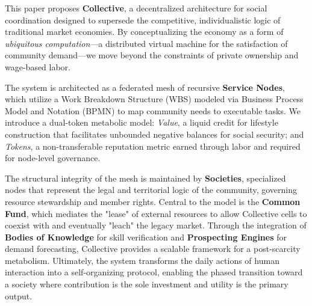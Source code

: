 
\noindent This paper proposes \textbf{Collective}, a decentralized architecture for social coordination designed to supersede the competitive, individualistic logic of traditional market economies. By conceptualizing the economy as a form of \textit{ubiquitous computation}—a distributed virtual machine for the satisfaction of community demand—we move beyond the constraints of private ownership and wage-based labor. 

The system is architected as a federated mesh of recursive \textbf{Service Nodes}, which utilize a Work Breakdown Structure (WBS) modeled via Business Process Model and Notation (BPMN) to map community needs to executable tasks. We introduce a dual-token metabolic model: \textit{Value}, a liquid credit for lifestyle construction that facilitates unbounded negative balances for social security; and \textit{Tokens}, a non-transferable reputation metric earned through labor and required for node-level governance. 

The structural integrity of the mesh is maintained by \textbf{Societies}, specialized nodes that represent the legal and territorial logic of the community, governing resource stewardship and member rights. Central to the model is the \textbf{Common Fund}, which mediates the "lease" of external resources to allow Collective cells to coexist with and eventually "leach" the legacy market. Through the integration of \textbf{Bodies of Knowledge} for skill verification and \textbf{Prospecting Engines} for demand forecasting, Collective provides a scalable framework for a post-scarcity metabolism. Ultimately, the system transforms the daily actions of human interaction into a self-organizing protocol, enabling the phased transition toward a society where contribution is the sole investment and utility is the primary output.